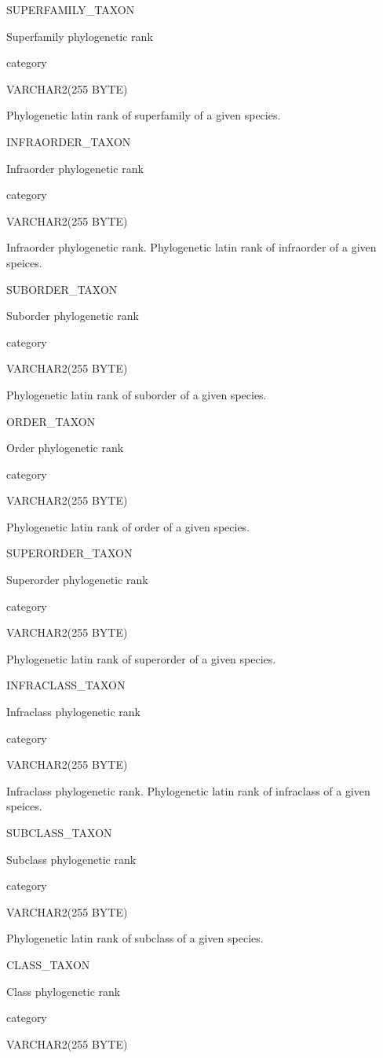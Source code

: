 \documentclass[
  letterpaper,
  oneside,
  open=any]{scrbook}
\begin{document}
SUPERFAMILY\_TAXON

Superfamily phylogenetic rank

category

VARCHAR2(255 BYTE)

Phylogenetic latin rank of superfamily of a given species.

INFRAORDER\_TAXON

Infraorder phylogenetic rank

category

VARCHAR2(255 BYTE)

Infraorder phylogenetic rank. Phylogenetic latin rank of infraorder of a
given speices.

SUBORDER\_TAXON

Suborder phylogenetic rank

category

VARCHAR2(255 BYTE)

Phylogenetic latin rank of suborder of a given species.

ORDER\_TAXON

Order phylogenetic rank

category

VARCHAR2(255 BYTE)

Phylogenetic latin rank of order of a given species.

SUPERORDER\_TAXON

Superorder phylogenetic rank

category

VARCHAR2(255 BYTE)

Phylogenetic latin rank of superorder of a given species.

INFRACLASS\_TAXON

Infraclass phylogenetic rank

category

VARCHAR2(255 BYTE)

Infraclass phylogenetic rank. Phylogenetic latin rank of infraclass of a
given speices.

SUBCLASS\_TAXON

Subclass phylogenetic rank

category

VARCHAR2(255 BYTE)

Phylogenetic latin rank of subclass of a given species.

CLASS\_TAXON

Class phylogenetic rank

category

VARCHAR2(255 BYTE)
\end{document}
